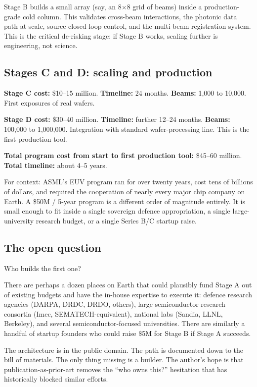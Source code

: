 \documentclass[11pt,letterpaper]{article}
\begin{document}
Stage B builds a small array (say, an 8$\times$8 grid of beams) inside a production-grade cold column. This validates cross-beam interactions, the photonic data path at scale, source closed-loop control, and the multi-beam registration system. This is the critical de-risking stage: if Stage B works, scaling further is engineering, not science.

\subsection{Stages C and D: scaling and production}

\textbf{Stage C cost:} \$10--15 million. \textbf{Timeline:} 24 months. \textbf{Beams:} 1{,}000 to 10{,}000. First exposures of real wafers.

\textbf{Stage D cost:} \$30--40 million. \textbf{Timeline:} further 12--24 months. \textbf{Beams:} 100{,}000 to 1{,}000{,}000. Integration with standard wafer-processing line. This is the first production tool.

\textbf{Total program cost from start to first production tool:} \$45--60 million. \textbf{Total timeline:} about 4--5 years.

For context: ASML's EUV program ran for over twenty years, cost tens of billions of dollars, and required the cooperation of nearly every major chip company on Earth. A \$50M / 5-year program is a different order of magnitude entirely. It is small enough to fit inside a single sovereign defence appropriation, a single large-university research budget, or a single Series B/C startup raise.

\subsection{The open question}

Who builds the first one?

There are perhaps a dozen places on Earth that could plausibly fund Stage A out of existing budgets and have the in-house expertise to execute it: defence research agencies (DARPA, DRDC, DRDO, others), large semiconductor research consortia (Imec, SEMATECH-equivalent), national labs (Sandia, LLNL, Berkeley), and several semiconductor-focused universities. There are similarly a handful of startup founders who could raise \$5M for Stage B if Stage A succeeds.

The architecture is in the public domain. The path is documented down to the bill of materials. The only thing missing is a builder. The author's hope is that publication-as-prior-art removes the ``who owns this?'' hesitation that has historically blocked similar efforts.
\end{document}
